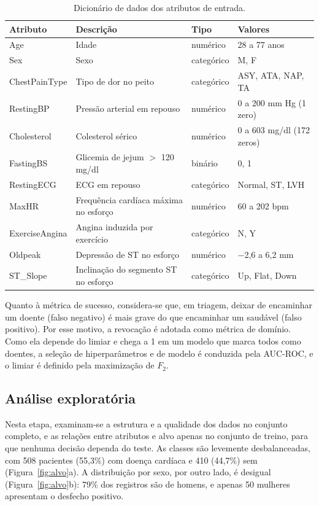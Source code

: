 \documentclass[12pt]{article}
\begin{document}
\begin{table}[!htb]
\centering
\caption{Dicionário de dados dos atributos de entrada.}
\label{tab:dicionario}
\footnotesize
\begin{tabular}{@{}llll@{}}
\toprule
Atributo & Descrição & Tipo & Valores \\
\midrule
Age & Idade & numérico & 28 a 77 anos \\
Sex & Sexo & categórico & M, F \\
ChestPainType & Tipo de dor no peito & categórico & ASY, ATA, NAP, TA \\
RestingBP & Pressão arterial em repouso & numérico & 0 a 200 mm Hg (1 zero) \\
Cholesterol & Colesterol sérico & numérico & 0 a 603 mg/dl (172 zeros) \\
FastingBS & Glicemia de jejum $>$ 120 mg/dl & binário & 0, 1 \\
RestingECG & ECG em repouso & categórico & Normal, ST, LVH \\
MaxHR & Frequência cardíaca máxima no esforço & numérico & 60 a 202 bpm \\
ExerciseAngina & Angina induzida por exercício & categórico & N, Y \\
Oldpeak & Depressão de ST no esforço & numérico & $-$2,6 a 6,2 mm \\
ST\_Slope & Inclinação do segmento ST no esforço & categórico & Up, Flat, Down \\
\bottomrule
\end{tabular}
\end{table}

Quanto à métrica de sucesso, considera-se que, em triagem, deixar de
encaminhar um doente (falso negativo) é mais grave do que encaminhar um
saudável (falso positivo). Por esse motivo, a revocação é adotada como
métrica de domínio. Como ela depende do limiar e chega a 1 em um modelo que
marca todos como doentes, a seleção de hiperparâmetros e de modelo é
conduzida pela AUC-ROC, e o limiar é definido pela maximização de $F_2$.

\subsection{Análise exploratória}

Nesta etapa, examinam-se a estrutura e a qualidade dos dados no conjunto
completo, e as relações entre atributos e alvo apenas no conjunto de treino,
para que nenhuma decisão dependa do teste. As classes são levemente
desbalanceadas, com 508 pacientes (55,3\%) com doença cardíaca e 410
(44,7\%) sem (Figura~\ref{fig:alvo}a). A distribuição por sexo, por outro
lado, é desigual (Figura~\ref{fig:alvo}b): 79\% dos registros são de homens,
e apenas 50 mulheres apresentam o desfecho positivo.
\end{document}
